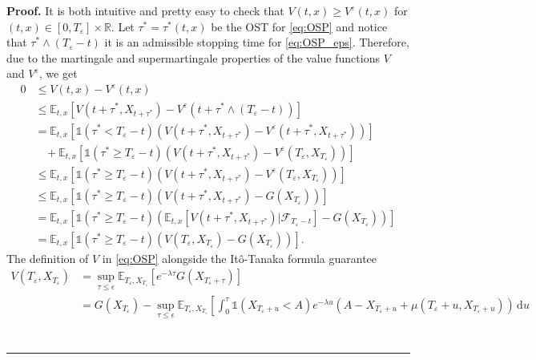 \documentclass{tufte-handout}
\newcommand{\E}{\mathbb{E}} %
\newcommand{\R}{\mathbb{R}} %
\newcommand{\dif}{\mathrm{d}}
\newenvironment{pf}[1][Proof]{\textbf{#1.} }{\ \rule{0.5em}{0.5em}}
\begin{document}
	\begin{pf}
		It is both intuitive and pretty easy to check that $V(t, x) \geq V^\varepsilon(t, x)$ for $(t, x) \in [0, T_\varepsilon]\times\R$. Let $\tau^* = \tau^*(t, x)$ be the OST for \eqref{eq:OSP} and notice that $\tau^*\wedge(T_\varepsilon - t)$ it is an admissible stopping time for \eqref{eq:OSP_eps}. Therefore, due to the martingale and supermartingale properties of the value functions $V$ and $V^{\varepsilon}$, we get
		\begin{align}
		0 &\leq V(t, x) - V^\varepsilon(t, x) \nonumber \\
		&\leq \E_{t, x}\left[V(t + \tau^*, X_{t + \tau^*}) - V^\varepsilon(t + \tau^*\wedge(T_\varepsilon - t))\right] \nonumber \\
		&= \E_{t, x}\left[\mathbb{1}(\tau^* < T_\varepsilon - t)\left(V(t + \tau^*, X_{t + \tau^*}) - V^\varepsilon(t + \tau^*, X_{t + \tau^*})\right)\right] \nonumber \\
		&\ \ \ \ + \E_{t, x}\left[\mathbb{1}(\tau^* \geq T_\varepsilon - t)\left(V(t + \tau^*, X_{t + \tau^*}) - V^\varepsilon(T_\varepsilon, X_{T_\varepsilon})\right)\right] \nonumber \\
		&\leq \E_{t, x}\left[\mathbb{1}(\tau^* \geq T_\varepsilon - t)\left(V(t + \tau^*, X_{t + \tau^*}) - V^\varepsilon(T_\varepsilon, X_{T_\varepsilon})\right)\right] \nonumber \\ 
		&\leq \E_{t, x}\left[\mathbb{1}(\tau^* \geq T_\varepsilon - t)\left(V(t + \tau^*, X_{t + \tau^*}) - G(X_{T_\varepsilon})\right)\right] \nonumber \\
		&= \E_{t, x}\left[\mathbb{1}(\tau^* \geq T_\varepsilon - t)\left(\E_{t, x}\left[V(t + \tau^*, X_{t + \tau^*}) | \mathcal{F}_{T_\varepsilon - t}\right] - G(X_{T_\varepsilon})\right)\right] \nonumber \\
		&= \E_{t, x}\left[\mathbb{1}(\tau^* \geq T_\varepsilon - t)\left(V(T_\varepsilon, X_{T_\varepsilon}) - G(X_{T_\varepsilon})\right)\right]. \label{eq:V^eps->V_}
		\end{align}
		The definition of $V$ in \eqref{eq:OSP} alongside the Itô-Tanaka formula guarantee 
		\begin{align}
			V(T_\varepsilon, X_{T_\varepsilon}) &= \sup_{\tau \leq \epsilon}\E_{T_\varepsilon, X_{T_\varepsilon}}\left[e^{-\lambda\tau}G(X_{T_\varepsilon + \tau})\right] \nonumber \\
			&= G(X_{T_\varepsilon}) - \sup_{\tau \leq \epsilon}\E_{T_\varepsilon, X_{T_\varepsilon}}\left[\int_{0}^{\tau}\mathbb{1}(X_{T_\varepsilon + u}< A)e^{-\lambda u}\left(A - X_{T_\varepsilon + u} + \mu(T_\varepsilon + u, X_{T_\varepsilon + u})\right)\,\dif u\right. \nonumber \\

\end{align}
\end{pf}
\end{document}
